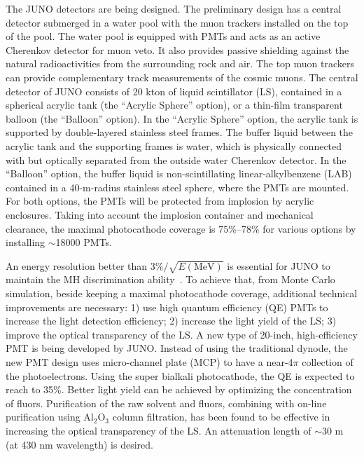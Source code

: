\documentclass[aps,twocolumn,preprintnumbers,amsmath,superscriptaddress,amssymb,floats,nofootinbib]{revtex4-1}
\begin{document}
The JUNO detectors are being designed. The preliminary design has a central detector submerged in a water pool with the muon trackers installed on the top of the pool. 
The water pool is equipped with PMTs and acts as an active Cherenkov detector for muon veto. 
It also provides passive shielding against the natural radioactivities from the surrounding rock and air. 
The top muon trackers can provide complementary track measurements of the cosmic muons. 
The central detector of JUNO consists of 20 kton of liquid scintillator (LS), contained in a spherical acrylic tank (the ``Acrylic Sphere'' option), or a thin-film transparent balloon (the ``Balloon'' option). 
In the ``Acrylic Sphere'' option, the acrylic tank is supported by double-layered stainless steel frames. 
The buffer liquid between the acrylic tank and the supporting frames is water, which is physically connected with but optically separated from the outside water Cherenkov detector. 
In the ``Balloon'' option, the buffer liquid is non-scintillating linear-alkylbenzene (LAB) contained in a 40-m-radius stainless steel sphere, where the PMTs are mounted. 
For both options, the PMTs will be protected from implosion by acrylic enclosures. 
Taking into account the implosion container and mechanical clearance, the maximal photocathode coverage is 75\%--78\% for various options by installing $\sim$18000 PMTs.

An energy resolution better than $3\%/\sqrt{E(\textrm{MeV})}$ is essential for JUNO to maintain the MH discrimination ability~\cite{Li-PRD13}. 
To achieve that, from Monte Carlo simulation, beside keeping a maximal photocathode coverage, additional technical improvements are necessary: 
1) use high quantum efficiency (QE) PMTs to increase the light detection efficiency;
2) increase the light yield of the LS;
3) improve the optical transparency of the LS.
A new type of 20-inch, high-efficiency PMT is being developed by JUNO. Instead of using the traditional dynode, the new PMT design uses micro-channel plate (MCP) to have a near-4$\pi$ collection of the photoelectrons. 
Using the super bialkali photocathode, the QE is expected to reach to 35\%. 
Better light yield can be achieved by optimizing the concentration of fluors. 
Purification of the raw solvent and fluors, combining with on-line purification using Al$_2$O$_3$ column filtration, has been found to be effective in increasing the optical transparency of the LS. An attenuation length of $\sim$30 m (at 430 nm wavelength) is desired.
\end{document}
